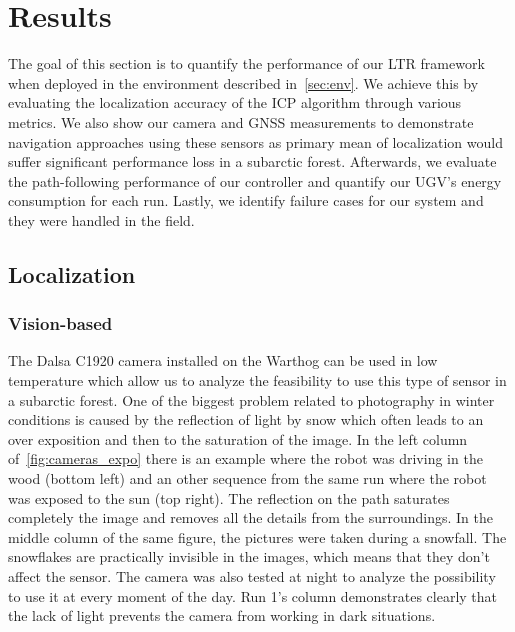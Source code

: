 \section{Results}
\label{sec:results}

The goal of this section is to quantify the performance of our \ac{LTR} framework when deployed in the environment described in~\autoref{sec:env}.
We achieve this by evaluating the localization accuracy of the \ac{ICP} algorithm through various metrics.
We also show our camera and \ac{GNSS} measurements to demonstrate navigation approaches using these sensors as primary mean of localization would suffer significant performance loss in a subarctic forest.
Afterwards, we evaluate the path-following performance of our controller and quantify our \ac{UGV}'s energy consumption for each run.
Lastly, we identify failure cases for our system and they were handled in the field.

\subsection{Localization}
\label{sec:res_loc}

\lightlipsum[1]

\subsubsection{Vision-based}
\label{sec:res_vis}


The Dalsa C1920 camera installed on the Warthog can be used in low temperature which allow us to analyze the feasibility to use this type of sensor in a subarctic forest. 
One of the biggest problem related to photography in winter conditions is caused by the reflection of light by snow which often leads to an over exposition and then to the saturation of the image. 
In the left column of~\autoref{fig:cameras_expo} there is an example where the robot was driving in the wood (bottom left) and an other sequence from the same run where the robot was exposed to the sun (top right). 
The reflection on the path saturates completely the image and removes all the details from the surroundings. 
In the middle column of the same figure, the pictures were taken during a snowfall. 
The snowflakes are practically invisible in the images, which means that they don't affect the sensor. 
The camera was also tested at night to analyze the possibility to use it at every moment of the day. 
Run 1's column demonstrates clearly that the lack of light prevents the camera from working in dark situations.

